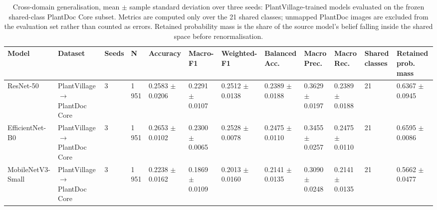 \begin{table}
\caption{Cross-domain generalisation, mean $\pm$ sample standard deviation over three seeds: PlantVillage-trained models evaluated on the frozen shared-class PlantDoc Core subset. Metrics are computed only over the 21 shared classes; unmapped PlantDoc images are excluded from the evaluation set rather than counted as errors. Retained probability mass is the share of the source model's belief falling inside the shared space before renormalisation.}
\label{tab:cross-domain}
\scriptsize
\centering
\setlength{\tabcolsep}{3pt}
\begin{tabular}{llllllllllll}
\toprule
Model & Dataset & Seeds & N & Accuracy & Macro-F1 & Weighted-F1 & Balanced Acc. & Macro Prec. & Macro Rec. & Shared classes & Retained prob. mass \\
\midrule
ResNet-50 & PlantVillage $\rightarrow$ PlantDoc Core & 3 & 1\,951 & 0.2583 $\pm$ 0.0206 & 0.2291 $\pm$ 0.0107 & 0.2512 $\pm$ 0.0138 & 0.2389 $\pm$ 0.0188 & 0.3629 $\pm$ 0.0197 & 0.2389 $\pm$ 0.0188 & 21 & 0.6367 $\pm$ 0.0945 \\
EfficientNet-B0 & PlantVillage $\rightarrow$ PlantDoc Core & 3 & 1\,951 & 0.2653 $\pm$ 0.0102 & 0.2300 $\pm$ 0.0065 & 0.2528 $\pm$ 0.0078 & 0.2475 $\pm$ 0.0110 & 0.3455 $\pm$ 0.0257 & 0.2475 $\pm$ 0.0110 & 21 & 0.6595 $\pm$ 0.0086 \\
MobileNetV3-Small & PlantVillage $\rightarrow$ PlantDoc Core & 3 & 1\,951 & 0.2238 $\pm$ 0.0162 & 0.1869 $\pm$ 0.0109 & 0.2013 $\pm$ 0.0160 & 0.2141 $\pm$ 0.0135 & 0.3090 $\pm$ 0.0248 & 0.2141 $\pm$ 0.0135 & 21 & 0.5662 $\pm$ 0.0477 \\
\bottomrule
\end{tabular}
\end{table}
